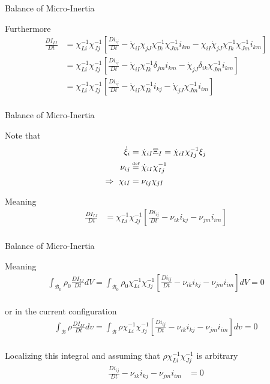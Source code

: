 \documentclass[11pt]{beamer}
\newcommand\defeq{\mathrel{\stackrel{\makebox[0pt]{\mbox{\normalfont\tiny def}}}{=}}}
\begin{document}
\begin{frame}{Balance of Micro-Inertia}

Furthermore
\begin{align*}
\frac{D I_{IJ}}{Dt} &= \chi_{Li}^{-1} \chi_{Jj}^{-1} \left[\frac{D i_{ij}}{Dt} - \dot{\chi}_{iI} \chi_{jJ} \chi_{Ik}^{-1} \chi_{Jm}^{-1} i_{km} - \chi_{iI} \dot{\chi}_{jJ} \chi_{Ik}^{-1} \chi_{Jm}^{-1} i_{km}\right]\\
&= \chi_{Li}^{-1} \chi_{Jj}^{-1} \left[\frac{D i_{ij}}{Dt} - \dot{\chi}_{iI} \chi_{Ik}^{-1} \delta_{jm} i_{km} - \dot{\chi}_{jJ} \delta_{ik} \chi_{Jm}^{-1} i_{km}\right]\\
&= \chi_{Li}^{-1} \chi_{Jj}^{-1} \left[\frac{D i_{ij}}{Dt} - \dot{\chi}_{iI} \chi_{Ik}^{-1} i_{kj} - \dot{\chi}_{jJ} \chi_{Jm}^{-1} i_{im}\right]\\
\end{align*}

\end{frame}

\begin{frame}{Balance of Micro-Inertia}

Note that
\begin{align*}
\dot{\xi}_i &= \dot{\chi}_{iI} \Xi_I = \dot{\chi}_{iI} \chi_{Ij}^{-1} \xi_j\\
\nu_{ij} &\defeq \dot{\chi}_{iI}\chi_{Ij}^{-1}\\
\Rightarrow\ \chi_{iI} &= \nu_{ij} \chi_{jI}\\
\end{align*}



Meaning
\begin{align*}
\frac{D I_{IJ}}{Dt} &= \chi_{Li}^{-1} \chi_{Jj}^{-1} \left[\frac{D i_{ij}}{Dt} - \nu_{ik} i_{kj} - \nu_{jm} i_{im}\right]\\
\end{align*}
\end{frame}

\begin{frame}{Balance of Micro-Inertia}

Meaning
\begin{align*}
\int_{\mathcal{B}_0} \rho_0 \frac{D I_{IJ}}{Dt} dV = \int_{\mathcal{B}_0} \rho_0 \chi_{Li}^{-1} \chi_{Jj}^{-1} \left[\frac{D i_{ij}}{Dt} - \nu_{ik} i_{kj} - \nu_{jm} i_{im}\right] dV = 0\\
\end{align*}

or in the current configuration
\begin{align*}
\int_{\mathcal{B}} \rho \frac{D I_{IJ}}{Dt} dv = \int_{\mathcal{B}} \rho \chi_{Li}^{-1} \chi_{Jj}^{-1} \left[\frac{D i_{ij}}{Dt} - \nu_{ik} i_{kj} - \nu_{jm} i_{im}\right] dv = 0\\
\end{align*}

Localizing this integral and assuming that $\rho \chi_{Li}^{-1} \chi_{Jj}^{-1}$ is arbitrary
\begin{align*}
\frac{D i_{ij}}{Dt} - \nu_{ik} i_{kj} - \nu_{jm} i_{im} &= 0\\
\end{align*}

\end{frame}
\end{document}
